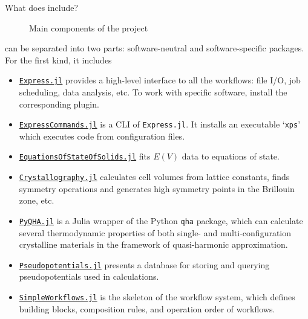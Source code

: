 \begin{frame}[allowframebreaks]{What does \express{} include?}
    \begin{figure}[H]
        \centering
        \caption{Main components of the \express{} project}
        \label{fig:components}
    \end{figure}

    \framebreak

    \express{} can be separated into two parts: software-neutral and software-specific packages.
    For the first kind, it includes
        {\footnotesize
            \begin{itemize}
                \item \href{https://github.com/MineralsCloud/Express.jl}{\texttt{Express.jl}}
                      provides a high-level interface to all the
                      workflows: file I/O, job scheduling, data analysis, etc.
                      To work with specific software, install the corresponding plugin.
                \item \href{https://github.com/MineralsCloud/ExpressCommands.jl}{\texttt{ExpressCommands.jl}}
                      is a CLI of \texttt{Express.jl}. It installs an executable
                      `\texttt{xps}' which executes code from configuration files.
                \item \href{https://github.com/MineralsCloud/EquationsOfStateOfSolids.jl}{\texttt{EquationsOfStateOfSolids.jl}}
                      fits $E(V)$ data to equations of state.
                \item \href{https://github.com/MineralsCloud/Crystallography.jl}{\texttt{Crystallography.jl}}
                      calculates cell volumes from lattice constants, finds symmetry
                      operations and generates high symmetry points in the Brillouin zone, etc.
                \item \href{https://github.com/MineralsCloud/PyQHA.jl}{\texttt{PyQHA.jl}}
                      is a Julia wrapper of
                      the Python \texttt{qha} package, which can calculate
                      several thermodynamic properties of both single- and multi-configuration
                      crystalline materials in the framework of quasi-harmonic approximation.
                \item \href{https://github.com/MineralsCloud/Pseudopotentials.jl}{\texttt{Pseudopotentials.jl}} presents
                      a database for storing and querying pseudopotentials used in \ab{} calculations.
                \item \href{https://github.com/MineralsCloud/SimpleWorkflows.jl}{\texttt{SimpleWorkflows.jl}}
                      is the skeleton of the workflow system, which
                      defines building blocks, composition rules, and operation order of workflows.
            \end{itemize}
        }


\end{frame}
